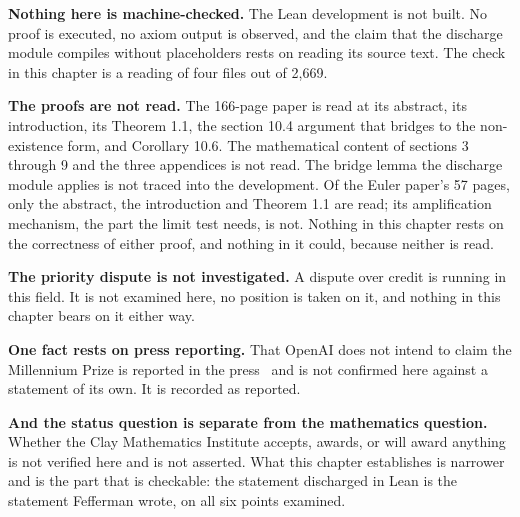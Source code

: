 \textbf{Nothing here is machine-checked.} The Lean development is not built. No proof is executed,
no axiom output is observed, and the claim that the discharge module compiles without placeholders
rests on reading its source text. The check in this chapter is a reading of four files out of
2{,}669.

\textbf{The proofs are not read.} The 166-page paper is read at its abstract, its introduction, its
Theorem 1.1, the section 10.4 argument that bridges to the non-existence form, and Corollary 10.6.
The mathematical content of sections 3 through 9 and the three appendices is not read. The bridge
lemma the discharge module applies is not traced into the development. Of the Euler paper's 57
pages, only the abstract, the introduction and Theorem 1.1 are read; its amplification mechanism,
the part the limit test needs, is not. Nothing in this chapter rests on the correctness of either
proof, and nothing in it could, because neither is read.

\textbf{The priority dispute is not investigated.} A dispute over credit is running in this field.
It is not examined here, no position is taken on it, and nothing in this chapter bears on it either
way.

\textbf{One fact rests on press reporting.} That OpenAI does not intend to claim the Millennium Prize
is reported in the press~\cite{src:RITS-2026} and is not confirmed here against a statement of its
own. It is recorded as reported.

\textbf{And the status question is separate from the mathematics question.} Whether the Clay
Mathematics Institute accepts, awards, or will award anything is not verified here and is not
asserted. What this chapter establishes is narrower and is the part that is checkable: the
statement discharged in Lean is the statement Fefferman wrote, on all six points examined.
